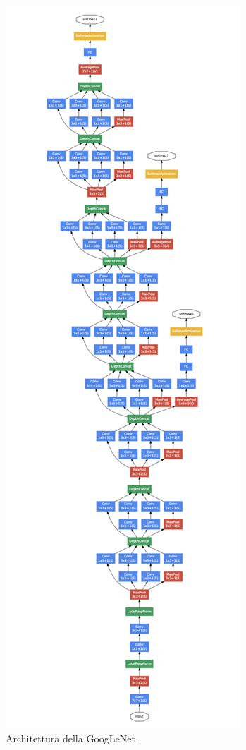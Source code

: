 \begin{figure}[h!]
  \hspace*{1.3in}
  \includegraphics[scale=0.75]{img/googlenet.png}
  \caption{Architettura della GoogLeNet \cite{inception}.}
  \label{fig:googlenet}
\end{figure}



